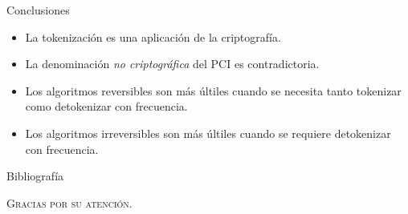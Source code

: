 \documentclass{beamer}
\begin{document}
  \begin{frame}{Conclusiones}
    \begin{itemize}
      \item La tokenización es una aplicación de la criptografía.
      \item La denominación \textit{no criptográfica} del PCI es contradictoria.
      \item Los algoritmos reversibles son más últiles cuando se necesita tanto tokenizar como detokenizar con frecuencia.
      \item Los algoritmos irreversibles son más últiles cuando se requiere detokenizar con frecuencia.
    \end{itemize}
  \end{frame}

  \begin{frame}[allowframebreaks]{Bibliografía}
    \printbibliography
  \end{frame}

  \begin{frame}{}
    \centering \Huge
    \textsc{Gracias por su atención.}
  \end{frame}

  \setlength{\parskip}{0.0em}

  {
  \frame{\titlepage}}
\end{document}
